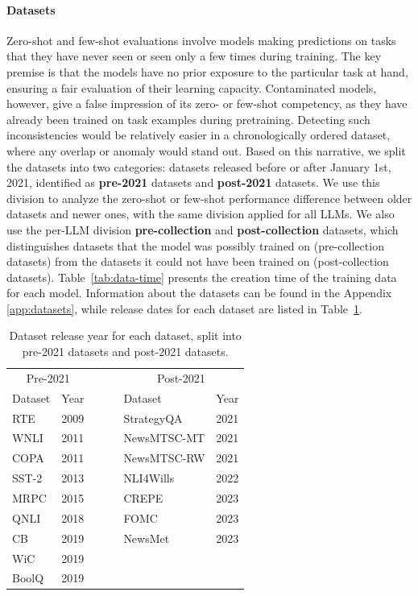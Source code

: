 \documentclass[letterpaper]{article} %
\newcommand{\jmf}[1]{}      %
\begin{document}
\paragraph{Datasets}
\jmf{update and expand}
Zero-shot and few-shot evaluations involve models making predictions on tasks that they have never seen or seen only a few times during training. The key premise is that the models have no prior exposure to the particular task at hand, ensuring a fair evaluation of their learning capacity. Contaminated models, however, give a false impression of its zero- or few-shot competency, as they have already been trained on task examples during pretraining. Detecting such inconsistencies would be relatively easier in a chronologically ordered dataset, where any overlap or anomaly would stand out. Based on this narrative, we split the datasets into two categories: 
datasets released before or after January 1st, 2021, identified as \textbf{pre-2021} datasets and \textbf{post-2021} datasets. We use this division to analyze the zero-shot or few-shot performance difference between older datasets and newer ones, with the same division applied for all LLMs. We also use the per-LLM division \textbf{pre-collection} and \textbf{post-collection} datasets, which distinguishes datasets that the model was possibly trained on (pre-collection datasets) from the datasets it could not have been trained on (post-collection datasets). Table~\ref{tab:data-time} presents the creation time of the training data for each model. Information about the datasets can be found in the Appendix \ref{app:datasets}, while release dates for each dataset are listed in Table~\ref{table:datasets}.

\begin{table}[htpb!]
\centering
\begin{tabular}{lllll}

\toprule
\multicolumn{2}{c}{Pre-2021} &  & \multicolumn{2}{c}{Post-2021} \\
     Dataset     &     Year     & ~~~ &     Dataset      &        Year  \\
     \cmidrule{1-2} \cmidrule{4-5}
     RTE     &    2009      &  &StrategyQA &  2021 \\
     WNLI     &   2011       &  &NewsMTSC-MT & 2021 \\
     COPA & 2011 &  & NewsMTSC-RW & 2021\\
     SST-2 & 2013&    & NLI4Wills & 2022 \\
     MRPC & 2015  &   & CREPE & 2023\\
     QNLI & 2018 &  & FOMC & 2023 \\
     CB &  2019&   &  NewsMet & 2023 \\
     WiC & 2019&   & \multicolumn{2}{c}{}\\
     BoolQ &  2019&  \\
\bottomrule
\end{tabular}
\caption{Dataset release year for each dataset, split into pre-2021 datasets and post-2021 datasets. }
\label{table:datasets}
\end{table}
\end{document}
